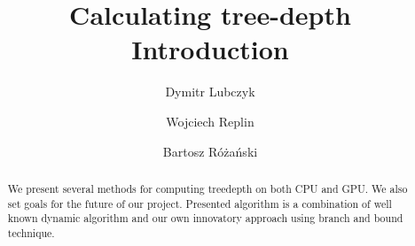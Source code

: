\documentclass[a4paper]{article}
\title{Calculating tree-depth\\Introduction}
\author{Dymitr Lubczyk \and Wojciech Replin \and Bartosz Różański}
\begin{document}
\maketitle
\begin{abstract}
	We present several methods for computing treedepth on both CPU and GPU. We also set goals for the future of our project. Presented algorithm is a combination of well known dynamic algorithm and our own innovatory approach using branch and bound technique.
\end{abstract}
\newpage
\tableofcontents
\newpage

\clearpage

\clearpage

\clearpage

\clearpage

\end{document}
